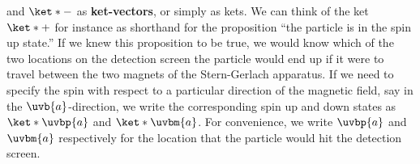 \documentclass[12pt]{report}
\begin{document}
%
and $\ket*{-}$ %
%
as \textbf{ket-vectors}, or simply as kets. We can think of the ket $\ket*{+}$ for instance as shorthand for the proposition “the particle is in the spin up state.” If we knew this proposition to be true, we would know which of the two locations on the detection screen the particle would end up if it were to travel between the two magnets of the Stern-Gerlach apparatus. If we need to specify the spin with respect to a particular direction of the magnetic field, say in the $\uvb{a}$-direction, %
%
 we write the corresponding spin up and down states as $\ket*{\uvbp{a}}$ %
%
and $\ket*{\uvbm{a}}$. %
%
For convenience, we write $\uvbp{a}$ %
%
and $\uvbm{a}$ %
%
respectively for the location that the particle would hit the detection screen.  
\end{document}
